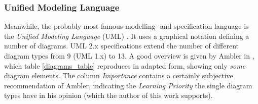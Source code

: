 %
%
%
%
%
%
%

\subsubsection{Unified Modeling Language}
\label{unified_modeling_language_heading}

Meanwhile, the probably most famous modelling- and specification language is
the \emph{Unified Modeling Language} (UML) \cite{uml, booch}. It uses a
graphical notation defining a number of diagrams. UML 2.x specifications
\cite{uml} extend the number of different diagram types from 9 (UML 1.x) to 13.
A good overview is given by Ambler in \cite{ambler2005}, which table
\ref{diagrams_table} reproduces in adapted form, showing only \emph{some}
diagram elements. The column \emph{Importance} contains a certainly subjective
recommendation of Ambler, indicating the \emph{Learning Priority} the single
diagram types have in his opinion (which the author of this work supports).

